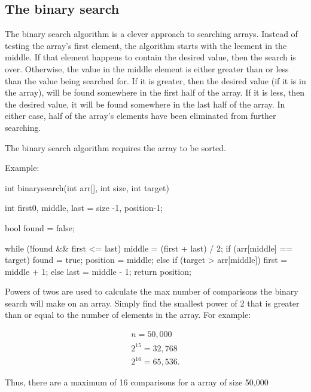 \documentclass{report}
\begin{document}
    \subsection{The binary search}
    \bigbreak \noindent 
    The binary search algorithm is a clever approach to searching arrays. Instead of testing the array's first element, the algorithm starts with the leement in the middle. If that element happens to contain the desired value, then the search is over. Otherwise, the value in the middle element is either greater than or less than the value being searched for. If it is greater, then the desired value (if it is in the array), will be found somewhere in the first half of the array. If it is less, then the desired value, it will be found somewhere in the last half of the array. In either case, half of the array's elements have been eliminated from further searching.
    \bigbreak \noindent 
    \begin{notebox}
			The binary search algorithm requires the array to be sorted.
		\end{notebox}
    \bigbreak \noindent 
    Example:
    \bigbreak \noindent 
    
    \begin{cppcode}
int binarysearch(int arr[], int size, int target) {
    int first{0}, 
        middle,
        last = size -1,
        position{-1};

    bool found = false;

    while (!found && first <= last) {
        middle = (first + last) / 2;
        if (arr[middle] == target) {
            found = true;
            position = middle;
        } else if (target > arr[middle]) {
            first = middle + 1;
        } else {
            last = middle - 1;
        }
    }
    return position;
}
    \end{cppcode}
    
    \bigbreak \noindent 
    Powers of twos are used to calculate the max number of comparisons the binary search will make on an array. Simply find the smallest power of 2 that is greater than or equal to the number of elements in the array. For example:
    \bigbreak \noindent 
    \begin{minipage}[]{0.47\textwidth}
    \begin{align*}
        n = 50,000 \\
        2^{15} = 32,768 \\
        2^{16} = 65,536
    .\end{align*}
    \end{minipage}
    \begin{minipage}[t]{0.47\textwidth}
        Thus, there are a maximum of 16 comparisons for a array of size 50,000
    \end{minipage}
\end{document}
